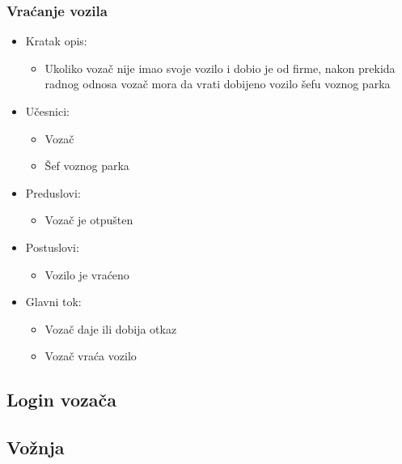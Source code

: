 \subsubsection{\bfseries Vraćanje vozila}
\begin{itemize}
	\item Kratak opis:
		\begin{itemize}
			\item Ukoliko vozač nije imao svoje vozilo i dobio je od firme, nakon prekida radnog odnosa vozač mora da vrati dobijeno vozilo šefu voznog parka
		\end{itemize}

	\item Učesnici:
		\begin{itemize}
		    \item Vozač
		    \item Šef voznog parka
		\end{itemize}


	\item Preduslovi:
		\begin{itemize}
		    \item Vozač je otpušten
		\end{itemize}


	\item Postuslovi:
		\begin{itemize}
			\item Vozilo je vraćeno
	\end{itemize}

	\item Glavni tok:
		\begin{itemize}
		    \item Vozač daje ili dobija otkaz
		    \item Vozač vraća vozilo
		\end{itemize}

\end{itemize}


\subsection{\bfseries Login vozača}

\subsection{\bfseries Vo\v znja}

